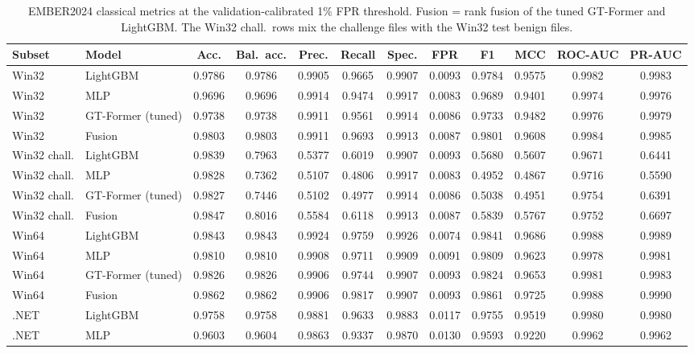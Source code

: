\documentclass[fleqn,10pt]{wlscirep}
\newcommand{\gtf}{GT\mbox{-}Former}
\newcommand{\lgbm}{LightGBM}
\begin{document}
\begin{table}[!htbp]
\centering
\scriptsize
\setlength{\tabcolsep}{2.5pt}
\caption{EMBER2024 classical metrics at the validation-calibrated 1\% FPR threshold. Fusion = rank fusion of the tuned \gtf{} and \lgbm{}. The Win32 chall.\ rows mix the challenge files with the Win32 test benign files.}
\label{tab:cls-ember}
\begin{tabular}{llcccccccccc}
\toprule
Subset & Model & Acc. & Bal.\ acc. & Prec. & Recall & Spec. & FPR & F1 & MCC & ROC-AUC & PR-AUC \\
\midrule
Win32 & \lgbm{} & 0.9786 & 0.9786 & 0.9905 & 0.9665 & 0.9907 & 0.0093 & 0.9784 & 0.9575 & 0.9982 & 0.9983 \\
Win32 & MLP & 0.9696 & 0.9696 & 0.9914 & 0.9474 & 0.9917 & 0.0083 & 0.9689 & 0.9401 & 0.9974 & 0.9976 \\
Win32 & \gtf{} (tuned) & 0.9738 & 0.9738 & 0.9911 & 0.9561 & 0.9914 & 0.0086 & 0.9733 & 0.9482 & 0.9976 & 0.9979 \\
Win32 & Fusion & 0.9803 & 0.9803 & 0.9911 & 0.9693 & 0.9913 & 0.0087 & 0.9801 & 0.9608 & 0.9984 & 0.9985 \\
Win32 chall. & \lgbm{} & 0.9839 & 0.7963 & 0.5377 & 0.6019 & 0.9907 & 0.0093 & 0.5680 & 0.5607 & 0.9671 & 0.6441 \\
Win32 chall. & MLP & 0.9828 & 0.7362 & 0.5107 & 0.4806 & 0.9917 & 0.0083 & 0.4952 & 0.4867 & 0.9716 & 0.5590 \\
Win32 chall. & \gtf{} (tuned) & 0.9827 & 0.7446 & 0.5102 & 0.4977 & 0.9914 & 0.0086 & 0.5038 & 0.4951 & 0.9754 & 0.6391 \\
Win32 chall. & Fusion & 0.9847 & 0.8016 & 0.5584 & 0.6118 & 0.9913 & 0.0087 & 0.5839 & 0.5767 & 0.9752 & 0.6697 \\
Win64 & \lgbm{} & 0.9843 & 0.9843 & 0.9924 & 0.9759 & 0.9926 & 0.0074 & 0.9841 & 0.9686 & 0.9988 & 0.9989 \\
Win64 & MLP & 0.9810 & 0.9810 & 0.9908 & 0.9711 & 0.9909 & 0.0091 & 0.9809 & 0.9623 & 0.9978 & 0.9981 \\
Win64 & \gtf{} (tuned) & 0.9826 & 0.9826 & 0.9906 & 0.9744 & 0.9907 & 0.0093 & 0.9824 & 0.9653 & 0.9981 & 0.9983 \\
Win64 & Fusion & 0.9862 & 0.9862 & 0.9906 & 0.9817 & 0.9907 & 0.0093 & 0.9861 & 0.9725 & 0.9988 & 0.9990 \\
.NET & \lgbm{} & 0.9758 & 0.9758 & 0.9881 & 0.9633 & 0.9883 & 0.0117 & 0.9755 & 0.9519 & 0.9980 & 0.9980 \\
.NET & MLP & 0.9603 & 0.9604 & 0.9863 & 0.9337 & 0.9870 & 0.0130 & 0.9593 & 0.9220 & 0.9962 & 0.9962 \\

\end{tabular}
\end{table}
\end{document}

